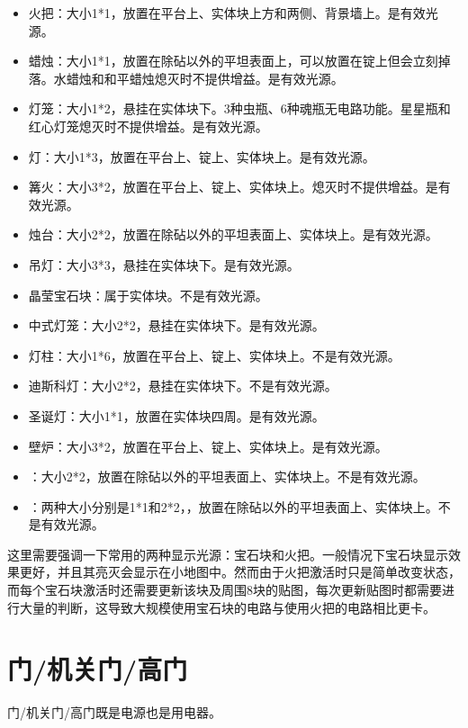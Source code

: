 \begin{itemize}
\item 火把：大小1*1，放置在平台上、实体块上方和两侧、背景墙上。是有效光源。
\item 蜡烛：大小1*1，放置在除砧以外的平坦表面上，可以放置在锭上但会立刻掉落。水蜡烛和和平蜡烛熄灭时不提供增益。是有效光源。
\item 灯笼：大小1*2，悬挂在实体块下。3种虫瓶、6种魂瓶无电路功能。星星瓶和红心灯笼熄灭时不提供增益。是有效光源。
\item 灯：大小1*3，放置在平台上、锭上、实体块上。是有效光源。
\item 篝火：大小3*2，放置在平台上、锭上、实体块上。熄灭时不提供增益。是有效光源。
\item 烛台：大小2*2，放置在除砧以外的平坦表面上、实体块上。是有效光源。
\item 吊灯：大小3*3，悬挂在实体块下。是有效光源。
\item 晶莹宝石块：属于实体块。不是有效光源。
\item 中式灯笼：大小2*2，悬挂在实体块下。是有效光源。
\item 灯柱：大小1*6，放置在平台上、锭上、实体块上。不是有效光源。
\item 迪斯科灯：大小2*2，悬挂在实体块下。不是有效光源。
\item 圣诞灯：大小1*1，放置在实体块四周。是有效光源。
\item 壁炉：大小3*2，放置在平台上、锭上、实体块上。是有效光源。
\item \PL ：大小2*2，放置在除砧以外的平坦表面上、实体块上。不是有效光源。
\item \Volcano ：两种\Volcano 大小分别是1*1和2*2，，放置在除砧以外的平坦表面上、实体块上。不是有效光源。
\end{itemize}

这里需要强调一下常用的两种显示光源：宝石块和火把。一般情况下宝石块显示效果更好，并且其亮灭会显示在小地图中。然而由于火把激活时只是简单改变状态，而每个宝石块激活时还需要更新该块及周围8块的贴图，每次更新贴图时都需要进行大量的判断，这导致大规模使用宝石块的电路与使用火把的电路相比更卡。

\section{门/机关门/高门}
\begin{figure}[!ht]
\centering
{}\qquad
{}\qquad
{}
\caption{}
\end{figure}
门/机关门/高门既是电源也是用电器。

